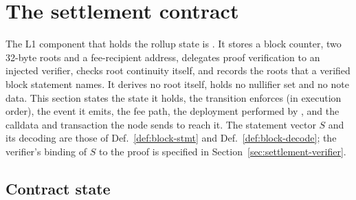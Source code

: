 \section{The settlement contract}
\label{sec:settlement}

The L1 component that holds the rollup state is 
. It stores a block counter, two
32-byte roots and a fee-recipient address, delegates proof verification to an
injected verifier, checks root continuity itself, and records the roots that a
verified block statement names. It derives no root itself, holds no nullifier
set and no note data.
This section states the state it holds, the transition 
enforces (in execution order), the event it emits, the fee path, the
deployment performed by , and the calldata and transaction the
node sends to reach it. The statement vector $S$ and its decoding are those of
Def.~\ref{def:block-stmt} and Def.~\ref{def:block-decode}; the verifier's
binding of $S$ to the proof is specified in Section~\ref{sec:settlement-verifier}.

\subsection{Contract state}
\label{subsec:pool-state}

